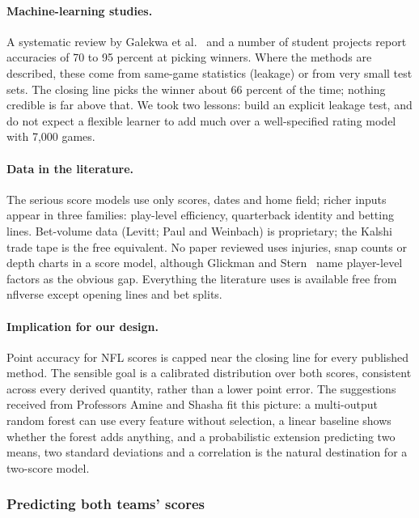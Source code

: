 \documentclass[11pt]{article}
\begin{document}
\paragraph{Machine-learning studies.} A systematic review by Galekwa et al.~\cite{mlreview2024} and a number of student projects report accuracies of 70 to 95 percent at picking winners. Where the methods are described, these come from same-game statistics (leakage) or from very small test sets. The closing line picks the winner about 66 percent of the time; nothing credible is far above that. We took two lessons: build an explicit leakage test, and do not expect a flexible learner to add much over a well-specified rating model with 7,000 games.

\paragraph{Data in the literature.} The serious score models use only scores, dates and home field; richer inputs appear in three families: play-level efficiency, quarterback identity and betting lines. Bet-volume data (Levitt; Paul and Weinbach) is proprietary; the Kalshi trade tape is the free equivalent. No paper reviewed uses injuries, snap counts or depth charts in a score model, although Glickman and Stern~\cite{glickmanstern2017} name player-level factors as the obvious gap. Everything the literature uses is available free from nflverse except opening lines and bet splits.

\paragraph{Implication for our design.} Point accuracy for NFL scores is capped near the closing line for every published method. The sensible goal is a calibrated distribution over both scores, consistent across every derived quantity, rather than a lower point error. The suggestions received from Professors Amine and Shasha fit this picture: a multi-output random forest can use every feature without selection, a linear baseline shows whether the forest adds anything, and a probabilistic extension predicting two means, two standard deviations and a correlation is the natural destination for a two-score model.

\subsubsection{Predicting both teams' scores}\label{sec:scoremodel}
\end{document}
